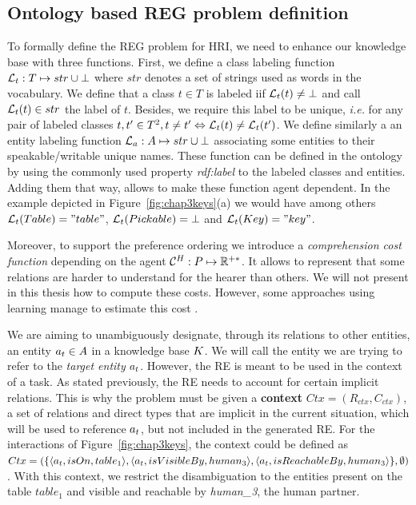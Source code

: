 \documentclass[a4paper,11pt,twoside]{StyleThese}
\begin{document}
\subsection{Ontology based REG problem definition}
To formally define the REG problem for HRI, we need to enhance our knowledge base with three functions.
First, we define a class labeling function $\mathcal{L}_t: T \mapsto str \cup \bot$ where $str$ denotes a set of strings used as words in the vocabulary. We define that a class $t \in T$ is labeled iif $\mathcal{L}_t(t) \neq \bot$ and call $\mathcal{L}_t(t) \in str$ the label of $t$. Besides, we require this label to be unique, \textit{i.e.} for any pair of labeled classes $t, t' \in T^2, t \neq t' \Leftrightarrow \mathcal{L}_t(t) \neq \mathcal{L}_t(t')$. We define similarly a an entity labeling function $\mathcal{L}_a: A \mapsto str \cup \bot$ associating some entities to their speakable/writable unique names. These function can be defined in the ontology by using the commonly used property \textit{rdf:label} to the labeled classes and entities. Adding them that way, allows to make these function agent dependent. In the example depicted in Figure~\ref{fig:chap3keys}(a) we would have among others $\mathcal{L}_t(Table) = "table"$, $\mathcal{L}_t(Pickable) = \bot$ and $\mathcal{L}_t(Key) = "key"$.

Moreover, to support the preference ordering we introduce a \textit{comprehension cost function} depending on the agent $\mathcal{C}^H: P \mapsto \mathbb{R}^{+*}$. It allows to represent that some relations are harder to understand for the hearer than others. We will not present in this thesis how to compute these costs. However, some approaches using learning manage to estimate this cost \cite{belke2002tracking, koolen2012learning}.

We are aiming to unambiguously designate, through its relations to other entities, an entity $a_t \in A$ in a knowledge base $K$. We will call the entity we are trying to refer to the \textit{target entity} $a_t$.
However, the RE is meant to be used in the context of a task. As stated previously, the RE needs to account for certain implicit relations. This is why the problem must be given a \textbf{context} $Ctx = (R_{ctx}, C_{ctx})$, a set of relations and direct types that are implicit in the current situation, which will be used to reference $a_t$, but not included in the generated RE. For the interactions of Figure~\ref{fig:chap3keys}, the context could be defined as $Ctx = (\{ \langle a_t, isOn, table_1 \rangle, \langle a_t, isVisibleBy, human_3 \rangle, \langle a_t, isReachableBy, human_3 \rangle \}, \emptyset)$. With this context, we restrict the disambiguation to the entities present on the table $table_1$ and visible and reachable by \textit{human\_3}, the human partner.
\end{document}
